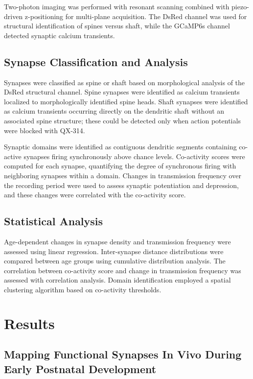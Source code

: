 \documentclass[11pt]{article}
\begin{document}
Two-photon imaging was performed with resonant scanning combined with piezo-driven z-positioning for multi-plane acquisition. The DsRed channel was used for structural identification of spines versus shaft, while the GCaMP6s channel detected synaptic calcium transients.

\subsection{Synapse Classification and Analysis}

Synapses were classified as spine or shaft based on morphological analysis of the DsRed structural channel. Spine synapses were identified as calcium transients localized to morphologically identified spine heads. Shaft synapses were identified as calcium transients occurring directly on the dendritic shaft without an associated spine structure; these could be detected only when action potentials were blocked with QX-314.

Synaptic domains were identified as contiguous dendritic segments containing co-active synapses firing synchronously above chance levels. Co-activity scores were computed for each synapse, quantifying the degree of synchronous firing with neighboring synapses within a domain. Changes in transmission frequency over the recording period were used to assess synaptic potentiation and depression, and these changes were correlated with the co-activity score.

\subsection{Statistical Analysis}

Age-dependent changes in synapse density and transmission frequency were assessed using linear regression. Inter-synapse distance distributions were compared between age groups using cumulative distribution analysis. The correlation between co-activity score and change in transmission frequency was assessed with correlation analysis. Domain identification employed a spatial clustering algorithm based on co-activity thresholds.

\section{Results}

\subsection{Mapping Functional Synapses In Vivo During Early Postnatal Development}
\end{document}
